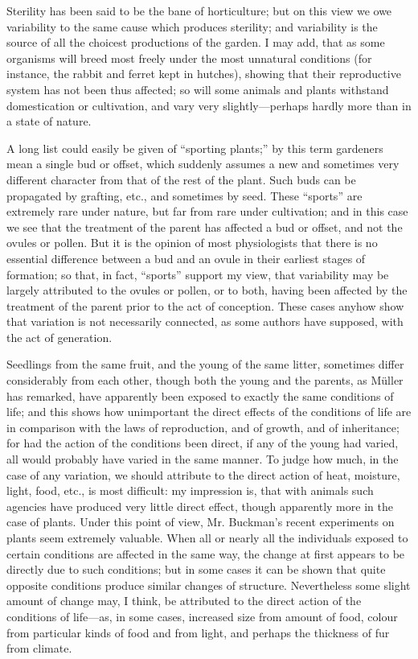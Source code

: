 \documentclass{book}
\begin{document}
Sterility has been said to be the bane of horticulture; but on this view we owe
variability to the same cause which produces sterility; and variability is the
source of all the choicest productions of the garden. I may add, that as some
organisms will breed most freely under the most unnatural conditions (for
instance, the rabbit and ferret kept in hutches), showing that their
reproductive system has not been thus affected; so will some animals and plants
withstand domestication or cultivation, and vary very slightly---perhaps
hardly more than in a state of nature.

A long list could easily be given of ``sporting plants;'' by this
term gardeners mean a single bud or offset, which suddenly assumes a new and
sometimes very different character from that of the rest of the plant.
Such buds can be propagated by grafting, etc., and sometimes by seed. These
``sports'' are extremely rare under nature, but far from rare under
cultivation; and in this case we see that the treatment of the parent has
affected a bud or offset, and not the ovules or pollen. But it is the opinion
of most physiologists that there is no essential difference between a bud and
an ovule in their earliest stages of formation; so that, in fact,
``sports'' support my view, that variability may be largely
attributed to the ovules or pollen, or to both, having been affected by the
treatment of the parent prior to the act of conception. These cases anyhow show
that variation is not necessarily connected, as some authors have supposed,
with the act of generation.

Seedlings from the same fruit, and the young of the same litter, sometimes
differ considerably from each other, though both the young and the parents, as
Müller has remarked, have apparently been exposed to exactly the same
conditions of life; and this shows how unimportant the direct effects of the
conditions of life are in comparison with the laws of reproduction, and of
growth, and of inheritance; for had the action of the conditions been direct,
if any of the young had varied, all would probably have varied in the same
manner. To judge how much, in the case of any variation, we should attribute to
the direct action of heat, moisture, light, food, etc., is most difficult: my
impression is, that with animals such agencies have produced very little direct
effect, though apparently more in the case of plants. Under this point of view,
Mr. Buckman's recent experiments on plants seem extremely valuable. When
all or nearly all the individuals exposed to certain conditions are affected in
the same way, the change at first appears to be directly due to such
conditions; but in some cases it can be shown that quite opposite conditions
produce
similar changes of structure. Nevertheless some slight amount of change may, I
think, be attributed to the direct action of the conditions of life---as,
in some cases, increased size from amount of food, colour from particular kinds
of food and from light, and perhaps the thickness of fur from climate.
\end{document}
